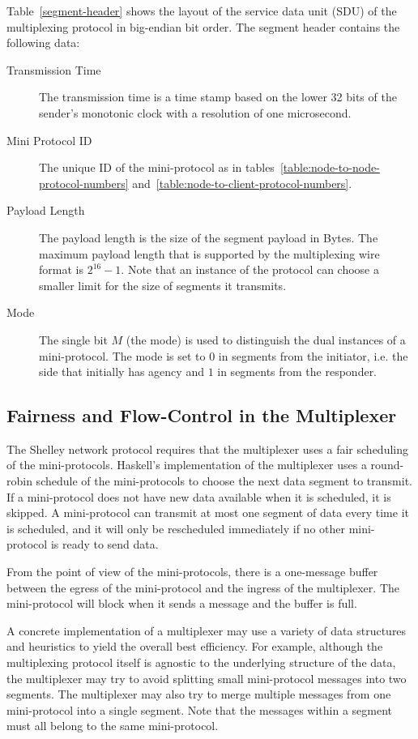 Table~\ref{segment-header} shows the layout of the service data unit (SDU) of the multiplexing protocol
in big-endian bit order.  The segment header contains the following data:
\begin{description}
\item[Transmission Time]
  The transmission time is a time stamp based on the lower 32 bits of the sender's monotonic clock with a
  resolution of one microsecond.
\item[Mini Protocol ID] The unique ID of the mini-protocol as in
  tables~\ref{table:node-to-node-protocol-numbers}
    and~\ref{table:node-to-client-protocol-numbers}.
\item[Payload Length] The payload length is the size of the segment payload in Bytes.
  The maximum payload length that is supported by the multiplexing wire format is $2^{16}-1$.
  Note that an instance of the protocol can choose a smaller limit for the size of segments it transmits.
\item[Mode] The single bit $M$ (the mode) is used to distinguish the dual instances of a mini-protocol.
  The mode is set to $0$ in segments from the initiator, i.e. the side that initially has agency and
  $1$ in segments from the responder.
\end{description}

\subsection{Fairness and Flow-Control in the Multiplexer}
The Shelley network protocol requires that the multiplexer uses a fair
scheduling of the mini-protocols.  Haskell's implementation of the
multiplexer uses a round-robin schedule of the mini-protocols to choose the
next data segment to transmit.  If a mini-protocol does not have new data
available when it is scheduled, it is skipped.  A mini-protocol can transmit at
most one segment of data every time it is scheduled, and it will only be
rescheduled immediately if no other mini-protocol is ready to send data.

From the point of view of the mini-protocols, there is a one-message buffer between the egress of
the mini-protocol and the ingress of the multiplexer.
The mini-protocol will block when it sends a message and the buffer is full.

A concrete implementation of a multiplexer may use a variety of data structures and heuristics to
yield the overall best efficiency.
For example, although the multiplexing protocol itself is agnostic to the underlying structure of
the data, the multiplexer may try to avoid splitting small mini-protocol messages into two segments.
The multiplexer may also try to merge multiple messages from one mini-protocol into a
single segment.
Note that the messages within a segment must all belong to the same mini-protocol.

